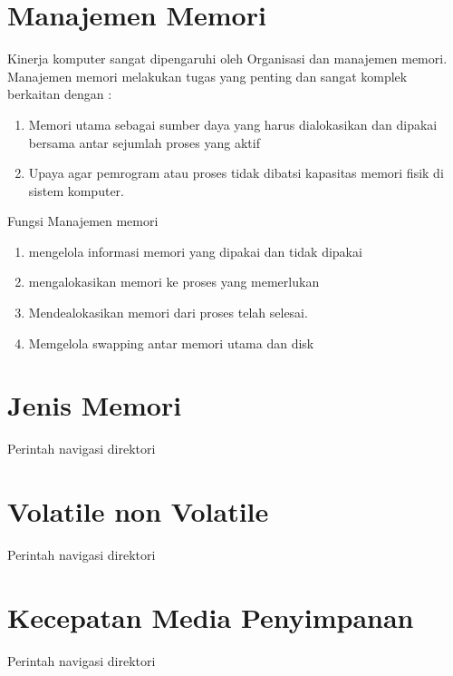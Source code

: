 \section{Manajemen Memori}
\par
Kinerja komputer sangat dipengaruhi oleh Organisasi dan manajemen memori.
Manajemen memori melakukan tugas yang penting dan sangat komplek berkaitan dengan :
\begin{enumerate}
\item Memori utama sebagai sumber daya yang harus dialokasikan dan dipakai bersama antar sejumlah proses yang aktif
\item Upaya agar pemrogram atau proses tidak dibatsi kapasitas memori fisik di sistem komputer.
\end{enumerate}

Fungsi Manajemen memori 
\begin{enumerate}
\item mengelola informasi memori yang dipakai dan tidak dipakai
\item mengalokasikan memori ke proses yang memerlukan
\item Mendealokasikan memori dari proses telah selesai.
\item Memgelola swapping antar memori utama dan disk
\end{enumerate}

\section{Jenis Memori}
Perintah navigasi direktori

\section{Volatile non Volatile}
Perintah navigasi direktori

\section{Kecepatan Media Penyimpanan}
Perintah navigasi direktori
